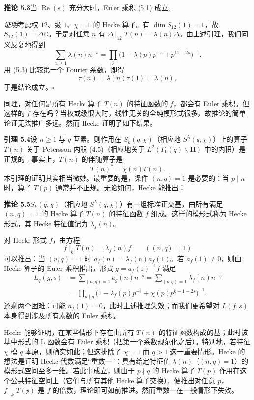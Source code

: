 \par\medskip\noindent\textbf{推论 5.3}\quad 当 $\operatorname{Re}(s)$ 充分大时，Euler 乘积 (5.1) 成立。

\emph{证明}\quad 考虑权 $12$、级 $1$、$\chi=1$ 的 Hecke 算子。有 $\dim S_{12}(1)=1$，故 $S_{12}(1)=\Delta\mathbb{C}$。于是对任意 $n$ 有 $\Delta\mid_{12}T(n)=\lambda(n)\Delta$。由上述引理，我们同义反复地得到
\[
\sum_{n\ge1}\lambda(n)n^{-s}=\prod_{p}\bigl(1-\lambda(p)p^{-s}+p^{11-2s}\bigr)^{-1}.
\]
用 (5.3) 比较第一个 Fourier 系数，即得
\[
\tau(n)=\lambda(n)\tau(1)=\lambda(n),
\]
于是结论成立。\hfill$\square$

同理，对任何是所有 Hecke 算子 $T(n)$ 的特征函数的 $f$，都会有 Euler 乘积。但这样的 $f$ 存在吗？当权或级很大时，线性无关的全纯模形式很多，故推论的简单论证无法推广多远。然而 Hecke 证明了如下结果。

\par\medskip\noindent\textbf{引理 5.4}\quad 设 $n\ge1$ 与 $q$ 互素。则作用在 $S_{k}(q,\chi)$（相应地 $S^{\lambda}(q,\chi)$）上的算子 $T(n)$ 关于 Petersson 内积 (4.5)（相应地关于 $L^{2}(\Gamma_{0}(q)\backslash\mathbf{H})$ 中的内积）是正规的；事实上，$T(n)$ 的伴随算子是
\[
T(n)^{*}=\overline{\chi}(n)T(n).
\]
本引理的证明其实相当微妙。最重要的是，条件 $(n,q)=1$ 是必要的：当 $p\mid n$ 时，算子 $T(p)$ 通常并不正规。无论如何，Hecke 能推出：

\par\medskip\noindent\textbf{推论 5.5}\quad $S_{k}(q,\chi)$（相应地 $S^{\lambda}(q,\chi)$）有一组标准正交基，由所有满足 $(n,q)=1$ 的 Hecke 算子 $T(n)$ 的特征函数 $f$ 组成。这样的模形式称为 Hecke 形式，其 Hecke 特征值记为 $\lambda_{f}(n)$。

对 Hecke 形式 $f$，由方程
\[
f\mid_{k}T(n)=\lambda_{f}(n)f\qquad((n,q)=1)
\]
可以推出：当 $(n,q)=1$ 时 $a_{f}(n)=\lambda_{f}(n)a_{f}(1)$。若 $a_{f}(1)\ne0$，则由 Hecke 算子的 Euler 乘积推出，形式 $g=a_{f}(1)^{-1}f$ 满足
\begin{align*}
L_{q}(g,s)&=\sum_{(n,q)=1}a_{g}(n)n^{-s}=\sum_{(n,q)=1}\lambda_{f}(n)n^{-s}\\
&=\prod_{p\nmid q}\bigl(1-\lambda_{f}(p)p^{-s}+\chi(p)p^{k-1-2s}\bigr)^{-1}.
\end{align*}
还剩两个困难：可能 $a_{f}(1)=0$，此时上述推理失效；而我们更希望对 $L(f,s)$ 本身得到涉及所有素数的 Euler 乘积。

Hecke 能够证明，在某些情形下存在由所有 $T(n)$ 的特征函数构成的基；此时该基中形式的 L 函数会有 Euler 乘积（把第一个系数规范化之后）。特别地，若特征 $\chi$ 模 $q$ 本原，则确实如此；但这排除了 $\chi=1$ 而 $q>1$ 这一重要情形。Hecke 的想法是证明 Hecke 代数满足“重数一”：具有给定特征值 $\lambda(n)$（$(n,q)=1$）的模形式空间至多一维。若此事成立，则由于 $p\nmid q$ 的 Hecke 算子 $T(p)$ 作用在这个公共特征空间上（它们与所有其他 Hecke 算子交换），便推出对任意 $p$，$f\mid_{k}T(p)$ 是 $f$ 的倍数，理论即可如前推进。然而重数一在一般情形下失效。

